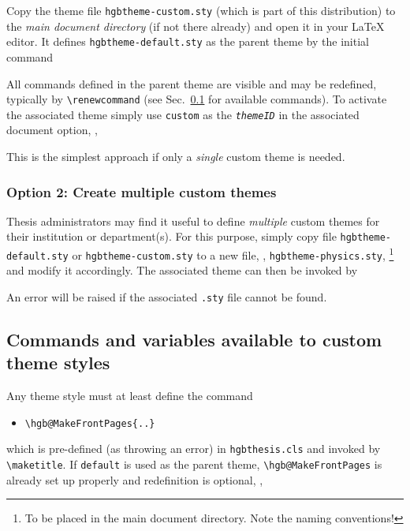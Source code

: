 \documentclass[language=english]{hgbarticle}
\begin{document}
Copy the theme file \texttt{hgbtheme-custom.sty} (which is part of this distribution) to the 
\emph{main document directory} (if not there already) and open it in your LaTeX editor.
It defines \texttt{hgbtheme-default.sty} as the parent theme by the initial command
\begin{LaTeXCode}[numbers=none]
\end{LaTeXCode}
%
All commands defined in the parent theme are visible and may be redefined,
typically by \verb!\renewcommand! (see Sec.\ \ref{sec:ThemeStyleCommands}
for available commands).
To activate the associated theme simply use \texttt{custom} as the \texttt{\textit{themeID}}
in the associated document option, \ie,
%
%
This is the simplest approach if only a \emph{single} custom theme is needed.

\subsubsection{Option 2: Create multiple custom themes}

Thesis administrators may find it useful to define \emph{multiple} custom themes for their
institution or department(s).
For this purpose, simply copy file \texttt{hgbtheme-default.sty} or \texttt{hgbtheme-custom.sty}
to a new file, \eg, \texttt{hgbtheme-physics.sty},%
\footnote{To be placed in the main document directory. Note the naming conventions!}
and modify it accordingly. The associated theme can then be invoked by
%
%
An error will be raised if the associated \texttt{.sty} file cannot be found.



\subsection{Commands and variables available to custom theme styles}
\label{sec:ThemeStyleCommands}

Any theme style must at least define the command
\begin{itemize}
  \item[] \verb!!
\end{itemize}
which is pre-defined (as throwing an error) in \texttt{hgbthesis.cls}
and invoked by \verb!\maketitle!.
If \texttt{default} is used as the parent theme, \verb!\hgb@MakeFrontPages! 
is already set up properly and redefinition is optional, \ie,
%
\begin{LaTeXCode}[numbers=none]
\renewcommand{\hgb@MakeFrontPages}{..}	%
\end{LaTeXCode}
%
\end{document}
